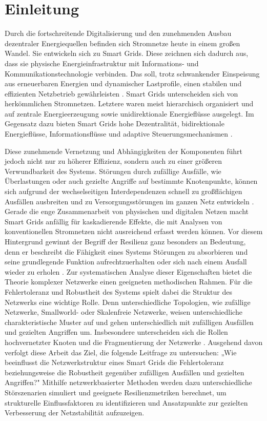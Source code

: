\section{Einleitung}
Durch die fortschreitende Digitalisierung und den zunehmenden Ausbau dezentraler 
Energiequellen befinden sich Stromnetze heute in einem großen Wandel. 
Sie entwickeln sich zu Smart Grids. Diese zeichnen sich dadurch aus, 
dass sie physische Energieinfrastruktur mit Informations- und 
Kommunikationstechnologie verbinden. Das soll, trotz schwankender Einspeisung aus 
erneuerbaren Energien und dynamischer Lastprofile, einen stabilen und effizienten 
Netzbetrieb gewährleisten \citep[S.529]{Gungor2013SmartGrid}. Smart Grids unterscheiden 
sich von herkömmlichen Stromnetzen. Letztere waren meist hierarchisch organisiert 
und auf zentrale Energieerzeugung sowie unidirektionale Energieflüsse ausgelegt. 
Im Gegensatz dazu bieten Smart Grids hohe Dezentralität, bidirektionale Energieflüsse,
 Informationsflüsse und adaptive Steuerungsmechanismen \citep[S. 12]{Appelrath2012SmartGrid}.

Diese zunehmende Vernetzung und Abhängigkeiten der Komponenten führt jedoch nicht nur
 zu höherer Effizienz, sondern auch zu einer größeren Verwundbarkeit des Systems. 
 Störungen durch zufällige Ausfälle, wie Überlastungen oder auch gezielte Angriffe 
 auf bestimmte Knotenpunkte, können sich aufgrund der wechselseitigen 
 Interdependenzen schnell zu großflächigen Ausfällen ausbreiten und zu 
 Versorgungsstörungen im ganzen Netz entwickeln \citep[S. 1025]{Buldyrev2010Interdependent}. 
 Gerade die enge Zusammenarbeit von physischen und digitalen Netzen macht Smart Grids 
 anfällig für kaskadierende Effekte, die mit Analysen von konventionellen Stromnetzen 
 nicht ausreichend erfasst werden können.
Vor diesem Hintergrund gewinnt der Begriff der Resilienz ganz besonders an Bedeutung,
 denn er beschreibt die Fähigkeit eines Systems Störungen zu absorbieren und seine grundlegende Funktion aufrechtzuerhalten oder sich nach einem Ausfall wieder zu erholen \citep[S. 17]{Holling1973Resilience}. Zur systematischen Analyse dieser Eigenschaften bietet die Theorie komplexer Netzwerke einen geeigneten methodischen Rahmen.
Für die Fehlertoleranz und Robustheit des Systems spielt dabei die Struktur des Netzwerks eine wichtige Rolle. Denn unterschiedliche Topologien, wie zufällige Netzwerke, Smallworld- oder Skalenfreie Netzwerke, weisen unterschiedliche charakteristische Muster auf und gehen unterschiedlich mit zufälligen Ausfällen und gezielten Angriffen um. Insbesondere unterscheiden sich die Rollen hochvernetzter Knoten und die Fragmentierung der Netzwerke \citep[S. 105ff]{Albert2000ErrorAttack}.
Ausgehend davon verfolgt diese Arbeit das Ziel, die folgende Leitfrage zu untersuchen: „Wie beeinflusst die Netzwerkstruktur eines Smart Grids die Fehlertoleranz beziehungsweise die Robustheit gegenüber zufälligen Ausfällen und gezielten Angriffen?" Mithilfe netzwerkbasierter Methoden werden dazu unterschiedliche Störszenarien simuliert und geeignete Resilienzmetriken berechnet, um strukturelle Einflussfaktoren zu identifizieren und Ansatzpunkte zur gezielten Verbesserung der Netzstabilität aufzuzeigen.





